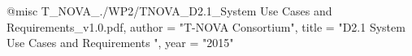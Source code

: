 @misc{ T_NOVA_./WP2/TNOVA_D2.1_System Use Cases and Requirements_v1.0.pdf,
       author = "{T-NOVA Consortium}",
       title = "D2.1 System Use Cases and Requirements ",
       year = "2015" }

